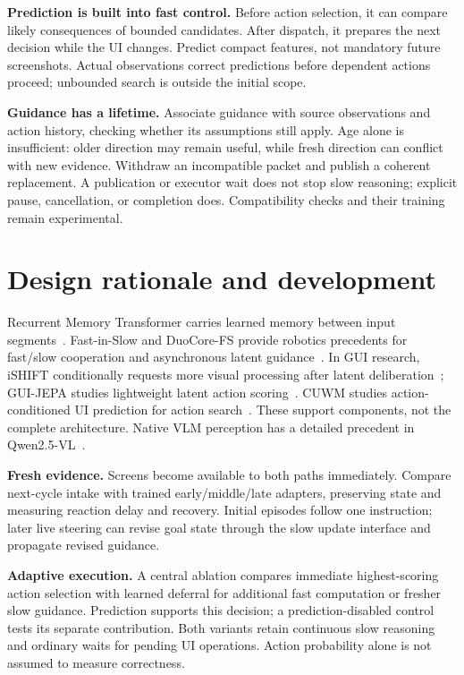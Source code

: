 \documentclass[11pt,letterpaper]{article}
\begin{document}
\textbf{Prediction is built into fast control.} Before action selection, it can compare likely consequences of bounded candidates. After dispatch, it prepares the next decision while the UI changes. Predict compact features, not mandatory future screenshots. Actual observations correct predictions before dependent actions proceed; unbounded search is outside the initial scope.

\textbf{Guidance has a lifetime.} Associate guidance with source observations and action history, checking whether its assumptions still apply. Age alone is insufficient: older direction may remain useful, while fresh direction can conflict with new evidence. Withdraw an incompatible packet and publish a coherent replacement. A publication or executor wait does not stop slow reasoning; explicit pause, cancellation, or completion does. Compatibility checks and their training remain experimental.

\clearpage
\section{Design rationale and development}
Recurrent Memory Transformer carries learned memory between input segments~\cite{rmt}. Fast-in-Slow and DuoCore-FS provide robotics precedents for fast/slow cooperation and asynchronous latent guidance~\cite{fastinslow,duocore}. In GUI research, iSHIFT conditionally requests more visual processing after latent deliberation~\cite{ishift}; GUI-JEPA studies lightweight latent action scoring~\cite{guijepa}. CUWM studies action-conditioned UI prediction for action search~\cite{cuwm}. These support components, not the complete architecture. Native VLM perception has a detailed precedent in Qwen2.5-VL~\cite{qwenvision}.

\textbf{Fresh evidence.} Screens become available to both paths immediately. Compare next-cycle intake with trained early/middle/late adapters, preserving state and measuring reaction delay and recovery. Initial episodes follow one instruction; later live steering can revise goal state through the slow update interface and propagate revised guidance.

\textbf{Adaptive execution.} A central ablation compares immediate highest-scoring action selection with learned deferral for additional fast computation or fresher slow guidance. Prediction supports this decision; a prediction-disabled control tests its separate contribution. Both variants retain continuous slow reasoning and ordinary waits for pending UI operations. Action probability alone is not assumed to measure correctness.
\end{document}
